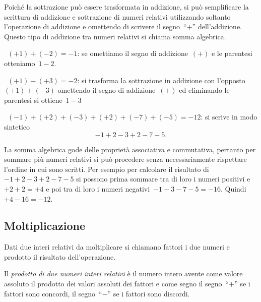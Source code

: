 Poiché la sottrazione può essere trasformata in addizione, si può semplificare 
la scrittura di addizione
e sottrazione di numeri relativi utilizzando soltanto l'operazione di addizione 
e omettendo di scrivere
il segno~``$+$'' dell'addizione. Questo tipo di addizione tra numeri relativi si 
chiama somma algebrica.

\begin{exrig}
 \begin{esempio}
~$(+1)+(-2)=-1$: se omettiamo il segno di addizione~$(+)$ e le parentesi 
otteniamo~$1-2$.
 \end{esempio}

\begin{esempio}
~$(+1)-(+3)=-2$: si trasforma la sottrazione in addizione con 
l'opposto~$(+1)+(-3)$ omettendo il segno
di addizione~$(+)$ ed eliminando le parentesi si ottiene~$1-3$
 \end{esempio}

\begin{esempio}
~$(-1)+(+2)+(-3)+(+2)+(-7)+(-5)=-12$: si scrive in modo sintetico 
\[-1+2-3+2-7-5.\]
 \end{esempio}

\end{exrig}

La somma algebrica gode delle proprietà associativa e commutativa, pertanto per 
sommare più numeri relativi
si può procedere senza necessariamente rispettare l'ordine in cui sono scritti. 
Per esempio per calcolare
il risultato di~$-1+2-3+2-7-5$ si possono prima sommare tra di loro i numeri 
positivi e~$+2+2=+4$
e poi tra di loro i numeri negativi~$-1-3-7-5=-16$. Quindi~$+4-16=-12$.


\subsection{Moltiplicazione}

Dati due interi relativi da moltiplicare si chiamano fattori i due numeri e 
prodotto il
risultato dell'operazione.

Il \emph{prodotto di due numeri interi relativi} è il numero intero avente come 
valore assoluto il prodotto
dei valori assoluti dei fattori e come segno il segno~``$+$'' se i fattori sono 
concordi,
il segno~``$-$'' se i fattori sono discordi.

